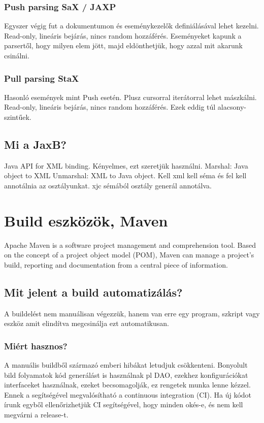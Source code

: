 \documentclass[a4paper,14pt]{extarticle}
\begin{document}
			\subsubsection{Push parsing SaX / JAXP}
			Egyszer végig fut a dokumentumon és eseménykezelők definiálásával lehet kezelni. Read-only, lineáris bejárás, nincs random hozzáférés. Eseményeket kapunk a parsertől, hogy milyen elem jött, majd eldönthetjük, hogy azzal mit akarunk csinálni.
			\subsubsection{Pull parsing StaX}
			Hasonló események mint Push esetén. Plusz
			cursorral iterátorral lehet mászkálni.
			Read-only, lineáris bejárás, nincs random hozzáférés.
			Ezek eddig túl alacsony-szintűek.
		\subsection{Mi a JaxB?}
			Java API for XML binding.
			Kényelmes, ezt szeretjük használni.
			Marshal: Java object to XML
			Unmarshal: XML to Java object.
			Kell xml kell séma és fel kell annotálnia az osztályunkat.
			\newline xjc sémából osztály generál annotálva.
	\section{Build eszközök, Maven}
		Apache Maven is a software project management and comprehension tool. Based on the concept of a project object model (POM), Maven can manage a project's build, reporting and documentation from a central piece of information. 
		\subsection{Mit jelent a build automatizálás?}
			A buildelést nem manuálisan végezzük, hanem van erre egy program, szkript vagy eszköz amit elindítva megcsinálja ezt automatikusan.
			\subsubsection{Miért hasznos?}
			A manuális buildből származó emberi hibákat letudjuk csökkenteni.
			Bonyolult bild folyamatok kód generálást is használnak pl DAO, ezekhez konfigurációkat interfaceket használnak, ezeket becsomagolják, ez rengetek munka lenne kézzel. Ennek a segítségével megvalósítható a continuous integration (CI). Ha új kódot írunk egyből ellenőrizhetjük CI segítségével, hogy minden okés-e, és nem kell megvárni a release-t.
\end{document}
